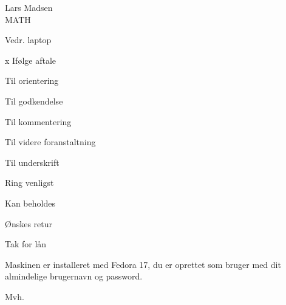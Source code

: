 \documentclass[danish,unit=imfau]{aultrdesign}
\begin{document}
\begin{ColophonData}
\end{ColophonData}

\begin{InformationArea}
  Lars Madsen\\
  MATH
\end{InformationArea}

\begin{coveringnote}

\opening{Vedr. laptop}

\begin{coveringnotelist}
\item[x] If\o lge aftale
\item Til orientering
\item Til godkendelse
\item Til kommentering
\item Til videre foranstaltning
\item Til underskrift
\item Ring venligst
\item Kan beholdes
\item \O nskes retur
\item Tak for l\aa n
\end{coveringnotelist}

Maskinen er installeret med Fedora 17, du er oprettet som bruger med
dit almindelige brugernavn og password.

\closing{Mvh.}

\end{coveringnote}
\end{document}
